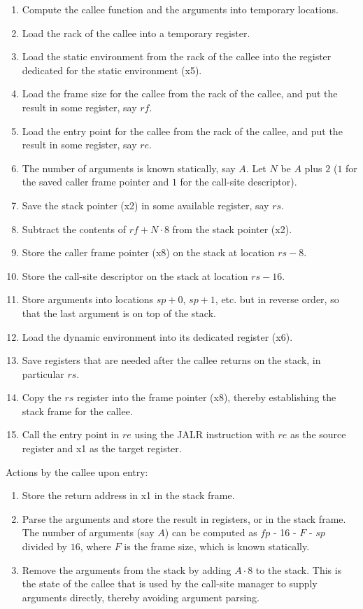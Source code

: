 \begin{enumerate}
\item Compute the callee function and the arguments into temporary
  locations.
\item Load the rack of the callee into a temporary register.
\item Load the static environment from the rack of the callee into the
  register dedicated for the static environment (x5).
\item Load the frame size for the callee from the rack of the
  callee, and put the result in some register, say $rf$.
\item Load the entry point for the callee from the rack of the callee,
  and put the result in some register, say $re$.
\item The number of arguments is known statically, say $A$.  Let $N$
  be $A$ plus $2$ ($1$ for the saved caller frame pointer and $1$ for
  the call-site descriptor).
\item Save the stack pointer (x2) in some available register, say $rs$.
\item Subtract the contents of $rf + N \cdot 8$ from the stack
  pointer (x2).
\item Store the caller frame pointer (x8) on the stack at location $rs
  - 8$.
\item Store the call-site descriptor on the stack at location $rs -
  16$.
\item Store arguments into locations $sp +  0$, $sp +  1$, etc. but in
  reverse order, so that the last argument is on top of the stack.
\item Load the dynamic environment into its dedicated register (x6).
\item Save registers that are needed after the callee returns on the
  stack, in particular $rs$.
\item Copy the $rs$ register into the frame pointer (x8), thereby
  establishing the stack frame for the callee.
\item Call the entry point in $re$ using the JALR instruction with
  $re$ as the source register and x1 as the target register.
\end{enumerate}

Actions by the callee upon entry:

\begin{enumerate}
\item Store the return address in x1 in the stack frame.
\item Parse the arguments and store the result in registers, or in the
  stack frame. The number of arguments (say $A$) can be
  computed as $fp$ - 16 - $F$ - $sp$ divided by $16$, where $F$ is the
  frame size, which is known statically.
\item Remove the arguments from the stack by adding $A \cdot 8$ to the
  stack.  This is the state of the callee that is used by the
  call-site manager to supply arguments directly, thereby avoiding
  argument parsing. 
\end{enumerate}


